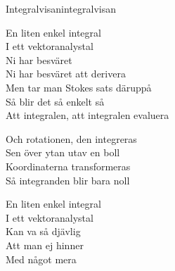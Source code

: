 \begin{song}{Integralvisan}{integralvisan}
\begin{vers}
En liten enkel integral\\
I ett vektoranalystal\\
Ni har besväret\\
Ni har besväret att derivera\\
Men tar man Stokes sats däruppå\\
Så blir det så enkelt så\\
Att integralen, att integralen evaluera\\
\end{vers}
\begin{vers}
Och rotationen, den integreras\\
Sen över ytan utav en boll\\
Koordinaterna transformeras\\
Så integranden blir bara noll\\
\end{vers}
\begin{vers}
En liten enkel integral\\
I ett vektoranalystal\\
Kan va så djävlig\\
Att man ej hinner\\
Med något mera\\
\end{vers}
\end{song}
